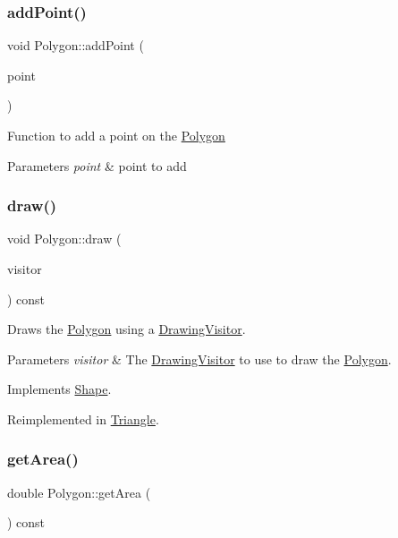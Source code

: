 \subsubsection{\texorpdfstring{add\+Point()}{addPoint()}}
{\footnotesize\ttfamily void Polygon\+::add\+Point (\begin{DoxyParamCaption}\item[{const \hyperlink{class_vector2_d}{Vector2D} \&}]{point }\end{DoxyParamCaption})}

Function to add a point on the \hyperlink{class_polygon}{Polygon} 
\begin{DoxyParams}{Parameters}
{\em point} & point to add \\
\hline
\end{DoxyParams}
\hypertarget{class_polygon_a245c526a6a65ea99f5549fe5243006d0}{}\label{class_polygon_a245c526a6a65ea99f5549fe5243006d0} 
\subsubsection{\texorpdfstring{draw()}{draw()}}
{\footnotesize\ttfamily void Polygon\+::draw (\begin{DoxyParamCaption}\item[{\hyperlink{class_drawing_visitor}{Drawing\+Visitor} $\ast$}]{visitor }\end{DoxyParamCaption}) const\hspace{0.3cm}{\ttfamily [virtual]}}

Draws the \hyperlink{class_polygon}{Polygon} using a \hyperlink{class_drawing_visitor}{Drawing\+Visitor}. 
\begin{DoxyParams}{Parameters}
{\em visitor} & The \hyperlink{class_drawing_visitor}{Drawing\+Visitor} to use to draw the \hyperlink{class_polygon}{Polygon}. \\
\hline
\end{DoxyParams}


Implements \hyperlink{class_shape_ae67fc6d39dd33759b65ff6112b21eab7}{Shape}.



Reimplemented in \hyperlink{class_triangle_a1fa834143ed718605959a227eba573b3}{Triangle}.

\hypertarget{class_polygon_ae1ae9dd5e5613f119af3e31488427b01}{}\label{class_polygon_ae1ae9dd5e5613f119af3e31488427b01} 
\subsubsection{\texorpdfstring{get\+Area()}{getArea()}}
{\footnotesize\ttfamily double Polygon\+::get\+Area (\begin{DoxyParamCaption}{ }\end{DoxyParamCaption}) const\hspace{0.3cm}{\ttfamily [virtual]}}

